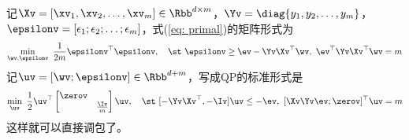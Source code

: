 \documentclass{ctexart}
\begin{document}
记$\Xv = [\xv_1, \xv_2, \ldots, \xv_m] \in \Rbb^{d \times m}$，$\Yv = \diag \{ y_1, y_2, \ldots, y_m\}$，$\epsilonv = [\epsilon_1; \epsilon_2; \ldots; \epsilon_m]$，式(\ref{eq: primal})的矩阵形式为
\begin{align*}
    \min_{\wv, \epsilonv} ~ \frac{1}{2m} \epsilonv^\top \epsilonv, \quad \st ~ \epsilonv \ge \ev - \Yv \Xv^\top \wv, ~ \ev^\top \Yv \Xv^\top \wv = m
\end{align*}
记$\uv = [\wv; \epsilonv] \in \Rbb^{d+m}$，写成QP的标准形式是
\begin{align*}
    \min_{\uv} ~ \frac{1}{2} \uv^\top \begin{bmatrix}
        \zerov \\ & \frac{\Iv}{m}
    \end{bmatrix} \uv, \quad \st ~ [- \Yv \Xv^\top, -\Iv] \uv \le -\ev, ~ [\Xv \Yv \ev; \zerov]^\top \uv = m
\end{align*}
这样就可以直接调包了。

%
\end{document}

